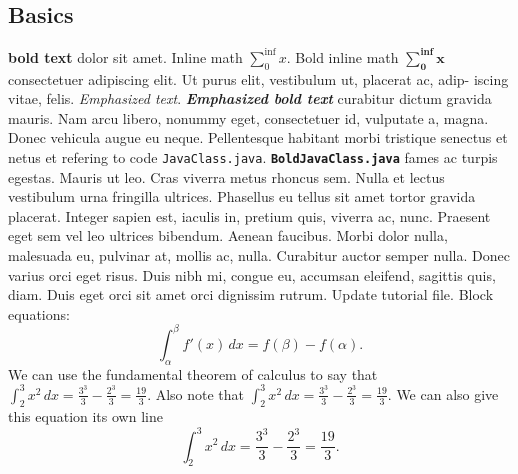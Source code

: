 \documentclass[12pt, dvipsnames, a4paper]{article}
\newcommand{\code}[1]{\texttt{#1}}
\begin{document}
\subsection{Basics}
\textbf{bold text} dolor sit amet. Inline math $\sum_{0}^{\inf} x$. Bold inline math $\mathbf{\sum_{0}^{\inf} x}$ consectetuer adipiscing elit. Ut purus elit, vestibulum ut, placerat ac, adip-
iscing vitae, felis. \emph{Emphasized text}. \textbf{\emph{Emphasized bold text}} curabitur dictum gravida mauris. Nam arcu libero, nonummy eget, consectetuer id,
vulputate a, magna. Donec vehicula augue eu neque. Pellentesque habitant morbi tristique senectus et
netus et refering to code \code{JavaClass.java}. \textbf{\code{BoldJavaClass.java}} fames ac turpis egestas. Mauris ut leo. Cras viverra metus rhoncus sem. Nulla et lectus
vestibulum urna fringilla ultrices. Phasellus eu tellus sit amet tortor gravida placerat. Integer sapien est,
iaculis in, pretium quis, viverra ac, nunc. Praesent eget sem vel leo ultrices bibendum. Aenean faucibus.
Morbi dolor nulla, malesuada eu, pulvinar at, mollis ac, nulla. Curabitur auctor semper nulla. Donec
varius orci eget risus. Duis nibh mi, congue eu, accumsan eleifend, sagittis quis, diam. Duis eget orci sit
amet orci dignissim rutrum. Update tutorial file. Block equations:
\begin{equation}
	\int_\alpha^\beta f'(x) \, dx=f(\beta)-f(\alpha).
\end{equation}
We can use the fundamental theorem of calculus to say that
$\int_2^3 x^2 \, dx=\frac{3^3}{3}-\frac{2^3}{3}=\frac{19}{3}$.
Also note that $\displaystyle \int_2^3 x^2 \, dx=\frac{3^3}{3}-\frac{2^3}{3}=\frac{19}{3}$.
We can also give this equation its own line
\[
	\int_2^3 x^2 \, dx=\frac{3^3}{3}-\frac{2^3}{3}=\frac{19}{3}.
\]
\end{document}
